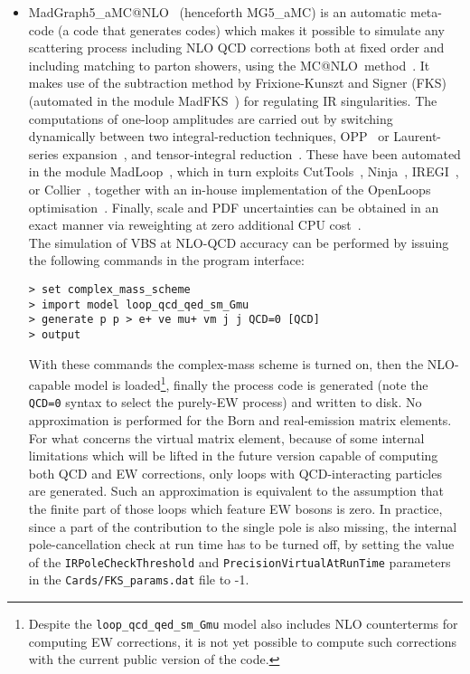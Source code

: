\begin{itemize}
  \item {\sc MadGraph5\_aMC@NLO}~\cite{Alwall:2014hca} (henceforth {\sc MG5\_aMC}) is an automatic meta-code (a code that generates codes) which makes it possible to simulate any scattering process
      including NLO QCD corrections both at fixed order and including matching to parton showers, using the {\sc MC@NLO}\ method~\cite{Frixione:2002ik}. It makes use of the subtraction method by Frixione-Kunszt and Signer (FKS)~\cite{Frixione:1995ms,
        Frixione:1997np} (automated in the module {\sc MadFKS}~\cite{Frederix:2009yq,
        Frederix:2016rdc}) for regulating IR singularities. The computations of one-loop amplitudes are carried out by switching dynamically between
        two integral-reduction techniques, OPP~\cite{Ossola:2006us} or Laurent-series expansion~\cite{Mastrolia:2012bu},
        and tensor-integral reduction~\cite{Passarino:1978jh,Davydychev:1991va,Denner:2005nn}. These have been automated in the module {\sc MadLoop}~\cite{Hirschi:2011pa}, which
        in turn exploits {\sc CutTools}~\cite{Ossola:2007ax}, {\sc Ninja}~\cite{Peraro:2014cba,
        Hirschi:2016mdz}, {\sc IREGI}~\cite{ShaoIREGI}, or {\sc Collier}~\cite{Denner:2016kdg}, together with an in-house 
        implementation of the {\sc OpenLoops} optimisation~\cite{Cascioli:2011va}. Finally, scale and PDF uncertainties can be obtained in an exact manner via reweighting
        at zero additional CPU cost~\cite{Frederix:2011ss}.\\
        The simulation of VBS at NLO-QCD accuracy can be performed by issuing the following commands in the program interface:
\begin{verbatim}
> set complex_mass_scheme
> import model loop_qcd_qed_sm_Gmu
> generate p p > e+ ve mu+ vm j j QCD=0 [QCD]
> output
\end{verbatim}
  With these commands the complex-mass scheme is turned on, then the NLO-capable model is loaded\footnote{Despite
            the {\tt loop\_qcd\_qed\_sm\_Gmu} model also includes NLO counterterms for computing EW corrections, it is not yet possible to compute such corrections
        with the current public version of the code.}, finally the process code is generated (note the {\tt QCD=0} syntax to select the purely-EW process)
        and written to disk. No approximation is performed for the Born and real-emission matrix elements. 
        For what concerns the virtual matrix element, because of some internal limitations which will be lifted in the future version capable of computing both QCD and EW corrections,
        only loops with QCD-interacting particles are generated. Such an approximation is equivalent to the assumption that the finite part of
        those loops which feature EW bosons is zero. In practice, since a part of the contribution to the single pole is also missing, the internal 
        pole-cancellation check at run time has to be turned off, by setting the value of the {\tt IR\-Pole\-Check\-Threshold} and 
        {\tt Precision\-Virtual\-At\-Run\-Time} parameters in the {\tt Cards\-/FKS\_\-params.dat} file to -1.


\end{itemize}
